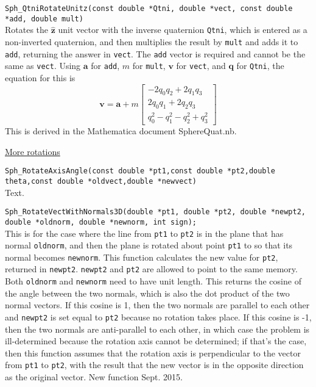 \documentclass[11pt]{article}
\newcommand {\ttt} {\texttt}
\begin{document}
\begin{description}
\item[\ttt{void}]
\ttt{Sph\_QtniRotateUnitz(const double *Qtni, double *vect, const double *add, double mult)}
\hfill \\
Rotates the $\hat{\bm{z}}$ unit vector with the inverse quaternion \ttt{Qtni}, which is entered as a non-inverted quaternion, and then multiplies the result by \ttt{mult} and adds it to \ttt{add}, returning the answer in \ttt{vect}. The \ttt{add} vector is required and cannot be the same as \ttt{vect}. Using $\bm{a}$ for \ttt{add}, $m$ for \ttt{mult}, $\bm{v}$ for \ttt{vect}, and $\bm{q}$ for \ttt{Qtni}, the equation for this is
$$\bm{v} = \bm{a} + m \left[ \begin{array}{c}
-2 q_0 q_2 + 2 q_1 q_3 \\
2 q_0 q_1 + 2 q_2 q_3 \\
q_0^2 - q_1^2 - q_2^2 + q_3^2
\end{array} \right]$$
This is derived in the Mathematica document SphereQuat.nb.

\item{\underline{More rotations}}

\item[\ttt{void}]
\ttt{Sph\_RotateAxisAngle(const double *pt1,const double *pt2,double theta,const double *oldvect,double *newvect)}
\hfill \\
Text.


\item[\ttt{double}]
\ttt{Sph\_RotateVectWithNormals3D(double *pt1, double *pt2, double *newpt2, double *oldnorm, double *newnorm, int sign);}
\hfill \\
This is for the case where the line from \ttt{pt1} to \ttt{pt2} is in the plane that has normal \ttt{oldnorm}, and then the plane is rotated about point \ttt{pt1} to so that its normal becomes \ttt{newnorm}. This function calculates the new value for \ttt{pt2}, returned in \ttt{newpt2}. \ttt{newpt2} and \ttt{pt2} are allowed to point to the same memory. Both \ttt{oldnorm} and \ttt{newnorm} need to have unit length. This returns the cosine of the angle between the two normals, which is also the dot product of the two normal vectors. If this cosine is 1, then the two normals are parallel to each other and \ttt{newpt2} is set equal to \ttt{pt2} because no rotation takes place. If this cosine is -1, then the two normals are anti-parallel to each other, in which case the problem is ill-determined because the rotation axis cannot be determined; if that's the case, then this function assumes that the rotation axis is perpendicular to the vector from \ttt{pt1} to \ttt{pt2}, with the result that the new vector is in the opposite direction as the original vector. New function Sept. 2015.


\end{description}
\end{document}
